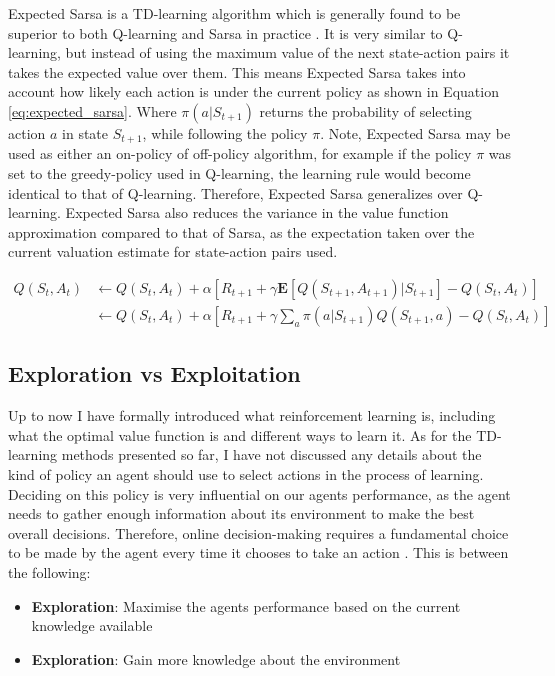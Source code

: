 \documentclass[ %
                    author={Callum Pearce},
                supervisor={Dr. Neill Campbell},
                    degree={MEng},
                     title={How effective are Temporal difference learning methods for reducing the number of zero contribution light paths, while still accurately approximating Global Illumination in Path tracing?},
                  subtitle={},
                      type={research},
                      year={2019} ]{dissertation}
\begin{document}
Expected Sarsa is a TD-learning algorithm which is generally found to be superior to both Q-learning and Sarsa in practice \cite{sutton2011reinforcement}. It is very similar to Q-learning, but instead of using the maximum value of the next state-action pairs it takes the expected value over them. This means Expected Sarsa takes into account how likely each action is under the current policy as shown in Equation \ref{eq:expected_sarsa}. Where $\pi(a | S_{t+1})$ returns the probability of selecting action $a$ in state $S_{t+1}$, while following the policy $\pi$. Note, Expected Sarsa may be used as either an on-policy of off-policy algorithm, for example if the policy $\pi$ was set to the greedy-policy used in Q-learning, the learning rule would become identical to that of Q-learning. Therefore, Expected Sarsa generalizes over Q-learning. Expected Sarsa also reduces the variance in the value function approximation compared to that of Sarsa, as the expectation taken over the current valuation estimate for state-action pairs used.

\begin{align}
Q(S_t, A_t) &  \leftarrow Q(S_t, A_t) + \alpha [R_{t+1} + \gamma \mathbf{E}[Q(S_{t+1}, A_{t+1}) | S_{t+1}] - Q(S_t, A_t)]\\
 & \leftarrow Q(S_t, A_t) + \alpha [R_{t+1} + \gamma \sum_a \pi(a| S_{t+1}) Q(S_{t+1}, a) - Q(S_t, A_t)]
 \label{eq:expected_sarsa}
\end{align}

\subsection{Exploration vs Exploitation}

Up to now I have formally introduced what reinforcement learning is, including what the optimal value function is and different ways to learn it. As for the TD-learning methods presented so far, I have not discussed any details about the kind of policy an agent should use to select actions in the process of learning. Deciding on this policy is very influential on our agents performance, as the agent needs to gather enough information about its environment to make the best overall decisions. Therefore, online decision-making requires a fundamental choice to be made by the agent every time it chooses to take an action \cite{exploration_vs_exploitation}. This is between the following:

\begin{itemize}
\item \textbf{Exploration}: Maximise the agents performance based on the current knowledge available
\item \textbf{Exploration}: Gain more knowledge about the environment
\end{itemize}
\end{document}

